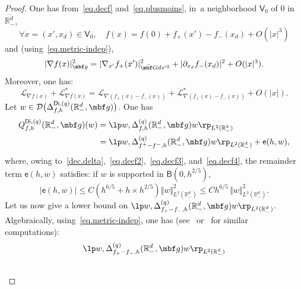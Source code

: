 \begin{proof}

One has from~\eqref{eq.decf} and~\eqref{eq.plusmoins}, in~a neighborhood $ \mathsf V_0$ of $0$ in $\overline{\mathbb R^d_-}$, \begin{equation}\label{eq.decf2}
\forall x=(x',x_d)\in \mathsf V_0,\quad f(x)=f(0)+ f_+(x')- f_-(x_d) +O(\vert x\vert^3)
\end{equation}
and (using~\eqref{eq.metric-indep}),
\begin{equation}\label{eq.decf3}
\vert \nabla f(x)\vert_{{\mbf g}}^2= \vert \nabla_{x'} f_+(x')\vert_{\tilde {\mbf G}dx'^2}^2 + \vert \partial_{x_d} f_-(x_d)\vert^2 +O(\vert x\vert^3).
\end{equation}
Moreover, one has:
\begin{equation}\label{eq.decf4}
\mathcal L_{\nabla f(x)}+ \mathcal L_{\nabla f(x)}^*= \mathcal L_{\nabla (f_+(x)-f_-(x))}+ \mathcal L_{\nabla (f_+(x)-f_-(x))}^*+ O(\vert x \vert).
\end{equation}
Let $w\in \mathcal D\bigl(\Delta_{f,h}^{\mathsf{Di},(q)}(\mathbb R_-^d, \mbf g) \bigr)$.
One has
\begin{equation}\label{eq.ref1}
\begin{aligned}
Q_{f,h}^{\mathsf{Di},(q)}(\mathbb R^d_-, \mbf g)(w)&=\lp w,
\Delta_{f,h}^{(q)}(\mathbb
R^d_-, \mbf g)
w\rp_{L^2(\mathbb
R^d_-)}\\
&=\lp w, \Delta_{f^+-f^-,h}^{(q)}(\mathbb R^d_-, \mbf g)
w\rp_{L^2(\mathbb
R^d_-)} + \mathsf e(h,w),
\end{aligned}
\end{equation}
where, owing
to~\eqref{dec.delta},~\eqref{eq.decf2},~\eqref{eq.decf3},
and~\eqref{eq.decf4}, the remainder term $\mathsf e(h,w)$ satisfies: if $w$ is supported in $\mathsf B(0,h^{2/5 })$,
\begin{equation}\label{taux-erreur}
\vert \mathsf e(h,w)\vert \le C (h^{6/5}+ h\times h^{2/5}) \Vert w \Vert_{L^2(\mathbb R^d_-)}^2\le Ch^{6/5}\, \Vert w \Vert_{L^2(\mathbb R^d_-)}^2.
\end{equation}
Let us now give a lower bound on $ \lp w,\Delta^{(q)}_{f_+-f_-,h}(\mathbb R^d_-, \mbf g)w\rp_{L^2(\mathbb R^d_-)}$.
Algebraically, using~\eqref{eq.metric-indep}, one has
(see~\cite[Eq.\,(3.17)]{helffer-nier-06} or~\cite[Eq.\,(4.3.16)]{le-peutrec-10}
for similar computations):
\begin{align}
\label{eq.dec55}
\lp w,\Delta^{(q)}_{f_+-f_-,h}&(\mathbb R^d_-, \mbf g)w\rp_{L^2(\mathbb R^d_-)}\\
\nonumber

\end{align}
\end{proof}
